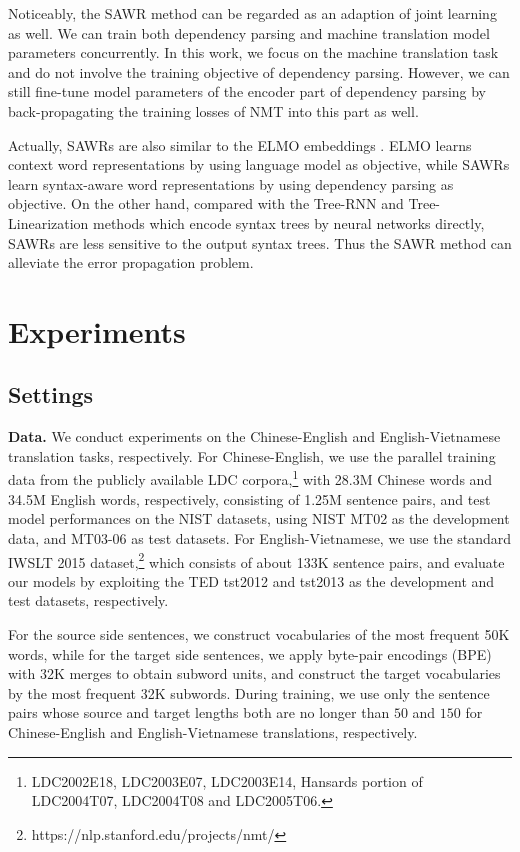 \documentclass[11pt,a4paper]{article}
\begin{document}
\begin{CJK}{UTF8}{gbsn}
Noticeably, the SAWR method can be regarded as an adaption of joint learning as well.
We can train both dependency parsing and machine translation model parameters concurrently.
In this work, we focus on the machine translation task
and do not involve the training objective of dependency parsing.
However, we can still fine-tune model parameters of the encoder part of dependency parsing
by back-propagating the training losses of NMT into this part as well.


Actually, SAWRs are also similar to the ELMO embeddings \cite{N18-1202-elmo}.
ELMO learns context word representations by using language model as objective,
while SAWRs learn syntax-aware word representations by using dependency parsing as objective.
On the other hand,
compared with the Tree-RNN and Tree-Linearization methods which encode syntax trees by neural networks directly,
SAWRs are less sensitive to the output syntax trees.
Thus the SAWR method can alleviate the error propagation problem.




\section{Experiments}


\subsection{Settings}

\textbf{Data.} We conduct experiments on the Chinese-English and English-Vietnamese translation tasks, respectively.
For Chinese-English,
we use the parallel training data from the publicly available LDC
corpora,\footnote{LDC2002E18, LDC2003E07, LDC2003E14, Hansards portion of LDC2004T07, LDC2004T08 and LDC2005T06.}
with 28.3M Chinese words and 34.5M English words, respectively,
consisting of 1.25M sentence pairs,
and test model performances on the NIST datasets,
using NIST MT02 as the development data, and MT03-06 as test datasets.
For English-Vietnamese, we use the standard  IWSLT 2015 dataset,\footnote{https://nlp.stanford.edu/projects/nmt/}
which consists of about 133K sentence pairs,
and evaluate our models by exploiting the TED tst2012  and tst2013
as the development and test datasets, respectively.

For the source side sentences,
we construct vocabularies of the most frequent 50K words,
while for the target side sentences,
we apply byte-pair encodings (BPE) \cite{sennrich-haddow-birch:2016:P16-12}
with 32K merges to obtain subword units,
and construct the target vocabularies by the most frequent 32K subwords.
During training,
we use only the sentence pairs whose source and target lengths both are no longer than $50$ and $150$ for Chinese-English and English-Vietnamese translations, respectively.




\end{CJK}
\end{document}
